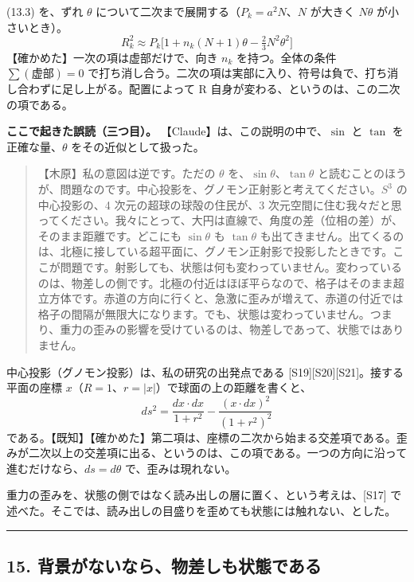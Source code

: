 \documentclass[
  a4paper,
]{ltjsarticle}
\begin{document}
(13.3) を、ずれ \(\theta\)
について二次まで展開する（\(P_k = a^2N\)、\(N\) が大きく \(N\theta\)
が小さいとき）。 \[
R_k^2 \approx P_k\big[1 + n_k(N+1)\theta - \tfrac23N^2\theta^2\big] \tag{14.1}
\] 【確かめた】一次の項は虚部だけで、向き \(n_k\) を持つ。全体の条件
\(\sum(\text{虚部}) = 0\)
で打ち消し合う。二次の項は実部に入り、符号は負で、打ち消し合わずに足し上がる。配置によって
R 自身が変わる、というのは、この二次の項である。

\textbf{ここで起きた誤読（三つ目）。}
【Claude】は、この説明の中で、\(\sin\) と \(\tan\)
を正確な量、\(\theta\) をその近似として扱った。

\begin{quote}
【木原】私の意図は逆です。ただの \(\theta\)
を、\(\sin\theta\)、\(\tan\theta\)
と読むことのほうが、問題なのです。中心投影を、グノモン正射影と考えてください。\(S^3\)
の中心投影の、4 次元の超球の球殻の住民が、3
次元空間に住む我々だと思ってください。我々にとって、大円は直線で、角度の差（位相の差）が、そのまま距離です。どこにも
\(\sin\theta\) も \(\tan\theta\)
も出てきません。出てくるのは、北極に接している超平面に、グノモン正射影で投影したときです。ここが問題です。射影しても、状態は何も変わっていません。変わっているのは、物差しの側です。北極の付近はほぼ平らなので、格子はそのまま超立方体です。赤道の方向に行くと、急激に歪みが増えて、赤道の付近では格子の間隔が無限大になります。でも、状態は変わっていません。つまり、重力の歪みの影響を受けているのは、物差しであって、状態ではありません。
\end{quote}

中心投影（グノモン投影）は、私の研究の出発点である
{[}S19{]}{[}S20{]}{[}S21{]}。接する平面の座標
\(x\)（\(R = 1\)、\(r = \lvert x\rvert\)）で球面の上の距離を書くと、 \[
ds^2 = \frac{dx\cdot dx}{1+r^2} - \frac{(x\cdot dx)^2}{(1+r^2)^2} \tag{14.2}
\]
である。【既知】【確かめた】第二項は、座標の二次から始まる交差項である。歪みが二次以上の交差項に出る、というのは、この項である。一つの方向に沿って進むだけなら、\(ds = d\theta\)
で、歪みは現れない。

重力の歪みを、状態の側ではなく読み出しの層に置く、という考えは、{[}S17{]}
で述べた。そこでは、読み出しの目盛りを歪めても状態には触れない、とした。

\begin{center}\rule{0.5\linewidth}{0.5pt}\end{center}

\subsection{15.
背景がないなら、物差しも状態である}\label{ux80ccux666fux304cux306aux3044ux306aux3089ux7269ux5deeux3057ux3082ux72b6ux614bux3067ux3042ux308b}
\end{document}
